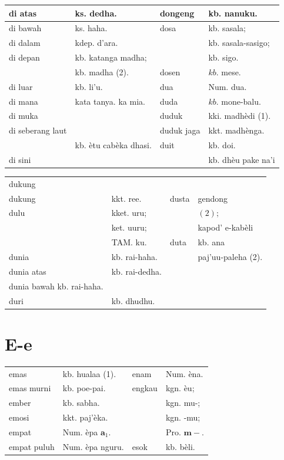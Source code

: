 \documentclass[10pt]{article}
\begin{document}
\begin{center}
\begin{tabular}{|l|l|l|l|}
\hline
di atas & ks. dedha. & dongeng & kb. nanuku. \\
\hline
di bawah & ks. haha. & dosa & kb. sasala; \\
\hline
di dalam & kdep. d'ara. &  & kb. sasala-sasigo; \\
\hline
di depan & kb. katanga madha; &  & kb. sigo. \\
\hline
 & kb. madha (2). & dosen & \(k b\). mese. \\
\hline
di luar & kb. li'u. & dua & Num. dua. \\
\hline
di mana & kata tanya. ka mia. & duda & \(k b\). mone-balu. \\
\hline
di muka &  & duduk & kki. madhèdi (1). \\
\hline
di seberang laut &  & duduk jaga & kkt. madhènga. \\
\hline
 & kb. ètu cabèka dhasi. & duit & kb. doi. \\
\hline
di sini &  &  & kb. dhèu pake na'i \\
\hline
\end{tabular}
\end{center}

\begin{center}
\begin{tabular}{llll}
dukung &  &  &  \\
dukung & kkt. ree. & dusta & gendong \\
dulu & kket. uru; &  & \((2) ;\) \\
 & ket. uuru; &  & kapod' e-kabèli \\
 & TAM. ku. & duta & kb. ana \\
dunia & kb. rai-haha. &  & paj'uu-paleha (2). \\
dunia atas & kb. rai-dedha. &  &  \\
dunia bawah kb. rai-haha. &  &  &  \\
duri & kb. dhudhu. &  &  \\
\end{tabular}
\end{center}

\section*{E-e}
\begin{center}
\begin{tabular}{llll}
emas & kb. hualaa (1). & enam & Num. èna. \\
emas murni & kb. poe-pai. & engkau & kgn. èu; \\
ember & kb. sabha. &  & kgn. mu-; \\
emosi & kkt. paj'èka. &  & kgn. -mu; \\
empat & Num. èpa \(\mathbf{a}_{1}\). &  & Pro. \(\mathbf{m -}\). \\
empat puluh & Num. èpa nguru. & esok & kb. bèli. \\
\end{tabular}
\end{center}
\end{document}
